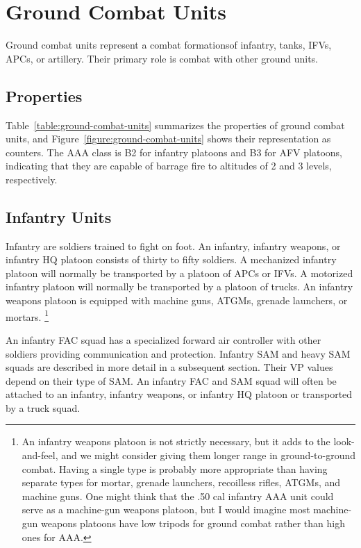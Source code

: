 \documentclass[10pt]{article}
\newcommand{\note}[1]{%
    \footnote{%
        \setlength{\parindent}{0pt}%
        \setlength{\parskip}{\smallskipamount}%
        #1
    }%
}
\begin{document}
\clearpage
\section{Ground Combat Units}

Ground combat units represent a combat formationsof infantry, tanks, IFVs, APCs, or artillery. Their primary role is combat with other ground units.

\subsection{Properties}

Table~\ref{table:ground-combat-units} summarizes the properties of ground combat units, and
Figure~\ref{figure:ground-combat-units} shows their representation as counters.
The AAA class is B2 for infantry platoons and B3 for AFV platoons, indicating that they are capable of barrage fire to altitudes of 2 and 3 levels, respectively.

\subsection{Infantry Units}

Infantry are soldiers trained to fight on foot. An infantry, infantry weapons, or infantry HQ platoon consists of thirty to fifty soldiers.
A mechanized infantry platoon will normally be transported by a platoon of APCs or IFVs.
A motorized infantry platoon will normally be transported by a platoon of trucks.
An infantry weapons platoon is equipped with machine guns, ATGMs, grenade launchers, or mortars.%
\note{
    An infantry weapons platoon is not strictly necessary, but it adds to the look-and-feel, and we might consider giving them longer range in ground-to-ground combat. Having a single type is probably more appropriate than having separate types for mortar, grenade launchers, recoilless rifles, ATGMs, and machine guns. One might think that the .50 cal infantry AAA unit could serve as a machine-gun weapons platoon, but I would imagine most machine-gun weapons platoons have low tripods for ground combat rather than high ones for AAA.
}

An infantry FAC squad has a specialized forward air controller with other soldiers providing communication and protection.
Infantry SAM and heavy SAM squads are described in more detail in a subsequent section. Their VP values depend on their type of SAM.
An infantry FAC and SAM squad will often be attached to an infantry, infantry weapons, or infantry HQ platoon or transported by a truck squad.
\end{document}
